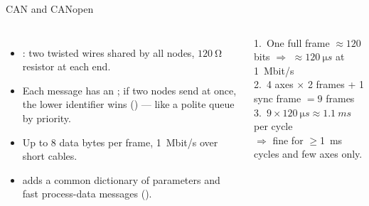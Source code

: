 \documentclass[aspectratio=169,10pt]{beamer}
\begin{document}
\begin{frame}{CAN and CANopen}
\begin{columns}[T]
\begin{itemize}\small
\item {}: two twisted wires shared by all nodes, $\SI{120}{\ohm}$ resistor at each end.
\item Each message has an ; if two nodes send at once, the lower identifier wins () --- like a polite queue by priority.
\item Up to 8 data bytes per frame, \SI{1}{Mbit/s} over short cables.
\item {} adds a common dictionary of parameters and fast process-data messages ().
\end{itemize}
\centering
{}

\vspace{2mm}
\begin{keybox}
\small
1.\ One full frame $\approx 120$ bits $\Rightarrow$ $\approx\SI{120}{\micro s}$ at \SI{1}{Mbit/s}\\
2.\ 4 axes $\times$ 2 frames + 1 sync frame $=9$ frames\\
3.\ $9\times\SI{120}{\micro s}\approx\SI{1.1}{ms}$ per cycle\\
$\Rightarrow$ fine for $\ge$\SI{1}{ms} cycles and few axes only.
\end{keybox}
\end{columns}
\end{frame}
\end{document}
